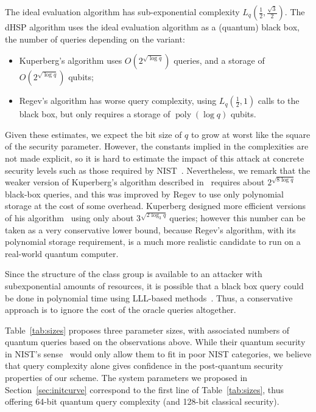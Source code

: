 \documentclass{llncs}
\DeclareMathOperator{\poly}{poly}
\begin{document}
The ideal evaluation algorithm has sub-exponential complexity
$L_q(\frac{1}{2},\frac{\sqrt{3}}{2})$.  The dHSP algorithm uses the
ideal evaluation algorithm as a (quantum) black box, the number of
queries depending on the variant:
\begin{itemize}
\item Kuperberg's algorithm uses $O(2^{\sqrt{\log q}})$ queries, and a
  storage of $O(2^{\sqrt{\log q}})$ qubits;
\item Regev's algorithm has worse query complexity, using
  $L_q(\frac{1}{2},1)$ calls to the black box, but only requires a
  storage of $\poly(\log q)$ qubits.
\end{itemize}

Given these estimates, we expect the bit size of $q$ to grow at
worst like the square of the security parameter. However,
the constants implied in the complexities are not made explicit, 
so it is hard to estimate the impact of this attack at concrete security levels
such as those required by NIST~\cite{NIST2016}.
Nevertheless, we remark that 
the weaker version of Kuperberg's algorithm described in~\cite[§2.1]{regev04} 
requires about $2^{\sqrt{8\log q}}$ black-box queries,
and this was improved by Regev to use only polynomial
storage at the cost of some overhead.
Kuperberg designed more efficient versions of his algorithm~\cite{Kup,todo}
using only about $3^{\sqrt{2 \log_3 q}}$ queries;
however this number can be taken as a very conservative lower bound,
because Regev's algorithm, with its polynomial storage requirement,
is a much more realistic candidate to run on a real-world quantum computer.


Since the structure of the class group is available to an
attacker with subexponential amounts of resources, it is possible
that a black box query could be done in polynomial time using
LLL-based methods~\cite[\S5]{cryptoeprint:2006:291}.
Thus, a conservative approach is to
ignore the cost of the oracle queries altogether.

Table~\ref{tab:sizes} proposes three parameter sizes,
with associated numbers of quantum queries based on the observations above.
While their quantum security in NIST's sense~\cite{NIST2016}
would only allow them to fit in poor NIST categories, we believe that query
complexity alone gives confidence in the post-quantum security properties
of our scheme.
The system parameters we proposed in Section~\ref{sec:initcurve}
correspond to the first line of Table~\ref{tab:sizes}, 
thus offering 64-bit quantum query complexity 
(and 128-bit classical security).
\end{document}

